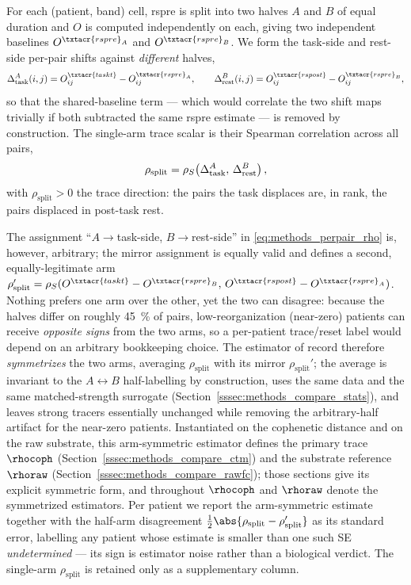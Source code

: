 For each (patient, band) cell, \acrshort{rspre} is split into two halves \(A\) and \(B\) of equal duration and \(O\) is computed independently on each, giving two independent baselines \(O^{\txtacr{rspre}_{A}}\) and \(O^{\txtacr{rspre}_{B}}\). We form the task-side and rest-side per-pair shifts against \emph{different} halves,
\begin{equation}
    \Delta_{\rm task}^{A}(i,j) = O^{\txtacr{taskt}}_{ij} - O^{\txtacr{rspre}_{A}}_{ij}, \qquad \Delta_{\rm rest}^{B}(i,j) = O^{\txtacr{rspost}}_{ij} - O^{\txtacr{rspre}_{B}}_{ij},
    \label{eq:methods_perpair_shifts}
\end{equation}
so that the shared-baseline term --- which would correlate the two shift maps trivially if both subtracted the same \acrshort{rspre} estimate --- is removed by construction. The single-arm trace scalar is their Spearman correlation across all pairs,
\begin{equation}
    \rho_{\mathrm{split}} = \rho_{S}\!\left(\Delta_{\rm task}^{A},\, \Delta_{\rm rest}^{B}\right),
    \label{eq:methods_perpair_rho}
\end{equation}
with \(\rho_{\mathrm{split}} > 0\) the trace direction: the pairs the task displaces are, in rank, the pairs displaced in post-task rest.

The assignment ``\(A\!\to\!\)task-side, \(B\!\to\!\)rest-side'' in \eqref{eq:methods_perpair_rho} is, however, arbitrary; the mirror assignment is equally valid and defines a second, equally-legitimate arm \(\rho_{\mathrm{split}}' = \rho_{S}(O^{\txtacr{taskt}} - O^{\txtacr{rspre}_{B}},\, O^{\txtacr{rspost}} - O^{\txtacr{rspre}_{A}})\). Nothing prefers one arm over the other, yet the two can disagree: because the halves differ on roughly \qty{45}{\percent} of pairs, low-reorganization (near-zero) patients can receive \emph{opposite signs} from the two arms, so a per-patient trace/reset label would depend on an arbitrary bookkeeping choice. The estimator of record therefore \emph{symmetrizes} the two arms, averaging \(\rho_{\mathrm{split}}\) with its mirror \(\rho_{\mathrm{split}}'\); the average is invariant to the \(A\!\leftrightarrow\!B\) half-labelling by construction, uses the same data and the same matched-strength surrogate (Section~\ref{sssec:methods_compare_stats}), and leaves strong tracers essentially unchanged while removing the arbitrary-half artifact for the near-zero patients. Instantiated on the cophenetic distance and on the raw substrate, this arm-symmetric estimator defines the primary trace \(\rhocoph\) (Section~\ref{sssec:methods_compare_ctm}) and the substrate reference \(\rhoraw\) (Section~\ref{sssec:methods_compare_rawfc}); those sections give its explicit symmetric form, and throughout \(\rhocoph\) and \(\rhoraw\) denote the symmetrized estimators. Per patient we report the arm-symmetric estimate together with the half-arm disagreement \(\tfrac{1}{2}\abs{\rho_{\mathrm{split}} - \rho_{\mathrm{split}}'}\) as its standard error, labelling any patient whose estimate is smaller than one such SE \emph{undetermined} --- its sign is estimator noise rather than a biological verdict. The single-arm \(\rho_{\mathrm{split}}\) is retained only as a supplementary column.

